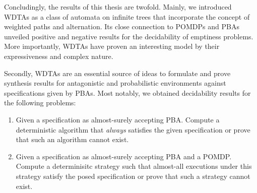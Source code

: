 Concludingly, the results of this thesis are twofold. Mainly, we
introduced \acp{WDTA} as a class of automata on infinite trees that incorporate
the concept of weighted paths and alternation. Its close connection to
\acp{POMDP} and \acp{PBA} unveiled positive and negative results for the
decidability of emptiness problems. More importantly, \acp{WDTA} have proven an
interesting model by their expressiveness and complex nature.

Secondly, \acp{WDTA} are an essential source of ideas to formulate and prove
synthesis results for antagonistic and probabilistic environments against
specifications given by \acp{PBA}. Most notably, we obtained decidability
results for the following problems:
\begin{enumerate}
  \item Given a specification as almost-surely accepting \ac{PBA}. Compute a
    deterministic algorithm that \emph{always} satisfies the given
    specification or prove that such an algorithm cannot exist.
  \item Given a specification as almost-surely accepting \ac{PBA} and a
    \ac{POMDP}. Compute a determinisitc strategy such that almost-all
    executions under this strategy satisfy the posed specification or prove
    that such a strategy cannot exist.
\end{enumerate}
